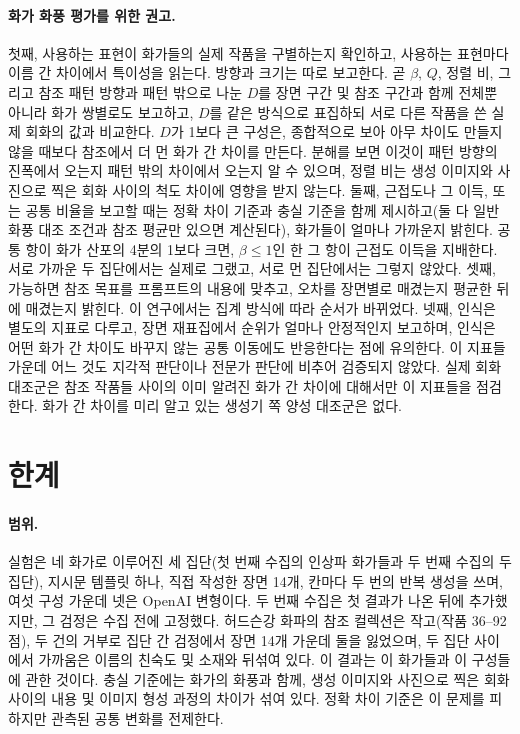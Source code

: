 \documentclass[10pt]{article}
\begin{document}
\paragraph{화가 화풍 평가를 위한 권고.}
첫째, 사용하는 표현이 화가들의 실제 작품을 구별하는지 확인하고, 사용하는 표현마다 이름 간 차이에서
특이성을 읽는다. 방향과 크기는 따로 보고한다. 곧 $\beta$, $Q$, 정렬 비, 그리고 참조 패턴 방향과 패턴
밖으로 나눈 $D$를 장면 구간 및 참조 구간과 함께 전체뿐 아니라 화가 쌍별로도 보고하고, $D$를 같은
방식으로 표집하되 서로 다른 작품을 쓴 실제 회화의 값과 비교한다. $D$가 1보다 큰 구성은, 종합적으로 보아
아무 차이도 만들지 않을 때보다 참조에서 더 먼 화가 간 차이를 만든다. 분해를 보면 이것이 패턴 방향의
진폭에서 오는지 패턴 밖의 차이에서 오는지 알 수 있으며, 정렬 비는 생성 이미지와 사진으로 찍은 회화
사이의 척도 차이에 영향을 받지 않는다. 둘째, 근접도나 그 이득, 또는 공통 비율을 보고할 때는 정확 차이
기준과 충실 기준을 함께 제시하고(둘 다 일반 화풍 대조 조건과 참조 평균만 있으면 계산된다), 화가들이
얼마나 가까운지 밝힌다. 공통 항이 화가 산포의 4분의 1보다 크면, $\beta\le1$인 한 그 항이 근접도 이득을
지배한다. 서로 가까운 두 집단에서는 실제로 그랬고, 서로 먼 집단에서는 그렇지 않았다. 셋째, 가능하면 참조
목표를 프롬프트의 내용에 맞추고, 오차를 장면별로 매겼는지 평균한 뒤에 매겼는지 밝힌다. 이 연구에서는
집계 방식에 따라 순서가 바뀌었다. 넷째, 인식은 별도의 지표로 다루고, 장면 재표집에서 순위가 얼마나
안정적인지 보고하며, 인식은 어떤 화가 간 차이도 바꾸지 않는 공통 이동에도 반응한다는 점에 유의한다. 이
지표들 가운데 어느 것도 지각적 판단이나 전문가 판단에 비추어 검증되지 않았다. 실제 회화 대조군은 참조
작품들 사이의 이미 알려진 화가 간 차이에 대해서만 이 지표들을 점검한다. 화가 간 차이를 미리 알고 있는
생성기 쪽 양성 대조군은 없다.

\section{한계}\label{sec:limitations}

\paragraph{범위.} 실험은 네 화가로 이루어진 세 집단(첫 번째 수집의 인상파 화가들과 두 번째 수집의 두
집단), 지시문 템플릿 하나, 직접 작성한 장면 14개, 칸마다 두 번의 반복 생성을 쓰며, 여섯 구성 가운데 넷은
OpenAI 변형이다. 두 번째 수집은 첫 결과가 나온 뒤에 추가했지만, 그 검정은 수집 전에 고정했다. 허드슨강
화파의 참조 컬렉션은 작고(작품 36--92점), 두 건의 거부로 집단 간 검정에서 장면 14개 가운데 둘을 잃었으며,
두 집단 사이에서 가까움은 이름의 친숙도 및 소재와 뒤섞여 있다. 이 결과는 이 화가들과 이 구성들에 관한
것이다. 충실 기준에는 화가의 화풍과 함께, 생성 이미지와 사진으로 찍은 회화 사이의 내용 및 이미지 형성
과정의 차이가 섞여 있다. 정확 차이 기준은 이 문제를 피하지만 관측된 공통 변화를 전제한다.
\end{document}
